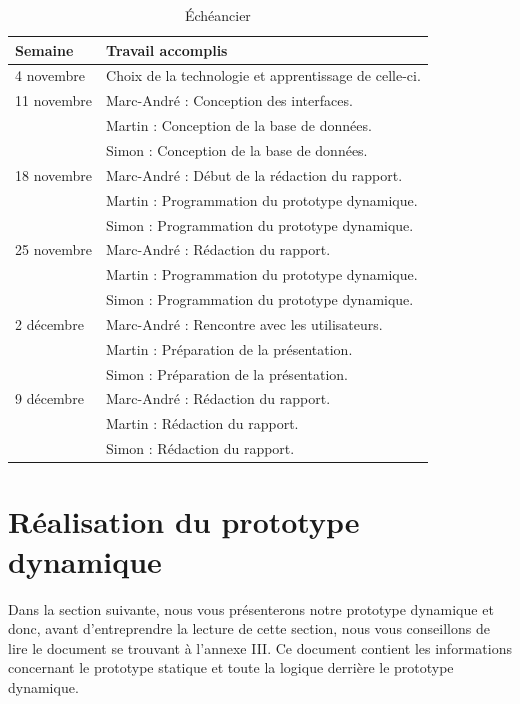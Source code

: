 \documentclass[letterpaper, oneside, 12pt, these, creativecommons]{thETS}
\begin{document}
\begin{table}
	\centering
	\begin{tabular}{|l|l|}
		\hline
		Semaine	& Travail accomplis 								\\ \hline \hline
		4 novembre	& Choix de la technologie et apprentissage de celle-ci.		\\ \hline
		11 novembre	& Marc-André : Conception des interfaces. 				\\
				& Martin : Conception de la base de données.				\\
				& Simon : Conception de la base de données.				\\ \hline
		18 novembre	& Marc-André : Début de la rédaction du rapport. 			\\ 
				& Martin : Programmation du prototype dynamique. 			\\
				& Simon : Programmation du prototype dynamique. 			\\ \hline
		25 novembre	& Marc-André : Rédaction du rapport.		 			\\
				& Martin : Programmation du prototype dynamique. 			\\ 
				& Simon : Programmation du prototype dynamique.		 	\\ \hline
		2 décembre	& Marc-André : Rencontre avec les utilisateurs. 			\\
				& Martin : Préparation de la présentation.				\\
				& Simon : Préparation de la présentation.				\\ \hline
		9 décembre	& Marc-André : Rédaction du rapport.	 				\\ 
				& Martin : Rédaction du rapport.	 					\\ 
				& Simon : Rédaction du rapport.			 			\\ \hline
	\end{tabular}
	\caption{Échéancier}
\end{table}

\chapter{Réalisation du prototype dynamique}

Dans la section suivante, nous vous présenterons notre prototype dynamique et donc, avant d'entreprendre la lecture de cette section, nous vous conseillons de lire le document se trouvant à l'annexe III. Ce document contient les informations concernant le prototype statique et toute la logique derrière le prototype dynamique.
\end{document}
